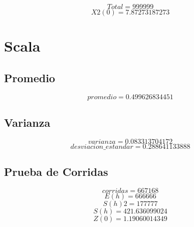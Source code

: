 \documentclass{article}
\begin{document}
$$
Total = 999999
$$
$$
X2(0) = 7.87273187273
$$
\section{Scala}


\subsection{Promedio}
$$
promedio = 0.499626834451
$$


\subsection{Varianza}
$$
varianza = 0.083313704172
$$
$$
desviacion\_estandar = 0.288641133888
$$


\subsection{Prueba de Corridas}
$$
corridas = 667168
$$
$$
E(h) = 666666
$$
$$
S(h)2 = 177777
$$
$$
S(h) = 421.636099024
$$
$$
Z(0) = 1.19060014349
$$
\end{document}

